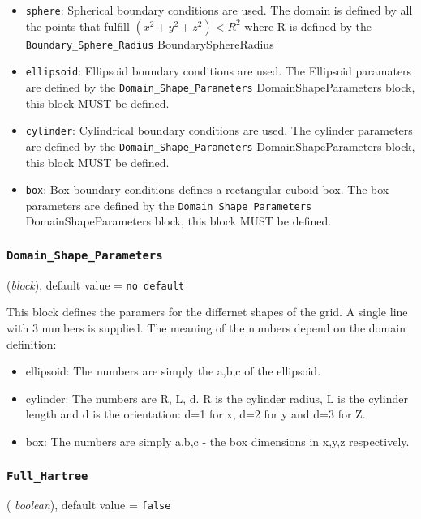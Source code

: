 \documentclass{article}
\begin{document}
\begin{itemize}
\item {\tt sphere}: Spherical boundary conditions are used. The domain is
defined by all the points that fulfill $(x^2+y^2+z^2)<R^2$ where R is defined
by the {\tt Boundary\_Sphere\_Radius} {BoundarySphereRadius}

\item {\tt ellipsoid}: Ellipsoid boundary conditions are used. The 
Ellipsoid paramaters are defined by the {\tt Domain\_Shape\_Parameters} 
{DomainShapeParameters} block, this block MUST be defined.

\item {\tt cylinder}: Cylindrical boundary conditions are used. The cylinder
parameters are defined by the {\tt Domain\_Shape\_Parameters}
{DomainShapeParameters} block, this block MUST be defined.

\item {\tt box}: Box boundary conditions defines a rectangular cuboid box. The
box parameters are defined by the {\tt Domain\_Shape\_Parameters}
{DomainShapeParameters} block, this block MUST be defined.
\end{itemize}

\subsubsection{\tt Domain\_Shape\_Parameters
\label{DomainShapeParameters}}
({\it block}), 
default value = {\tt no default}

This block defines the paramers for the differnet shapes of the grid. A
single line with 3 numbers is supplied. The meaning of the numbers depend
on the domain definition:

\begin{itemize}
\item{ellipsoid}: The numbers are simply the a,b,c of the ellipsoid. 

\item{cylinder}: The numbers are R, L, d. R is the cylinder radius, L is
the cylinder length and d is the orientation: d=1 for x, d=2 for y and d=3
for Z. 

\item{box}: The numbers are simply a,b,c - the box dimensions in x,y,z 
respectively.
\end{itemize} 
 
\subsubsection{\tt Full\_Hartree
\label{FullHartree}}
( {\it boolean}),
default value = {\tt false }
\end{document}
